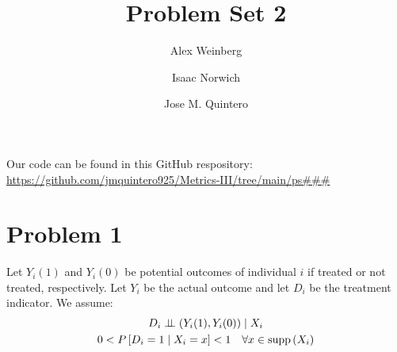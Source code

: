 \documentclass{article}
\title{Problem Set 2}
\author{Alex Weinberg \and Isaac Norwich \and Jose M. Quintero}
\begin{document}
\maketitle

Our code can be found in this GitHub respository: \url{https://github.com/jmquintero925/Metrics-III/tree/main/ps###}


\section*{Problem 1}
Let $Y_{i}(1)$ and $Y_{i}(0)$ be potential outcomes of individual $i$ if treated or not treated, respectively. Let $Y_{i}$ be the actual outcome and let $D_{i}$ be the treatment indicator. We assume:
\begin{align*}
\begin{gathered}
D_{i} \perp\!\!\!\perp \left(Y_{i}(1), Y_{i}(0)\right) \mid X_{i} \\
0<P\left[D_{i}=1 \mid X_{i}=x\right]<1 \quad \forall x \in \operatorname{supp}\left(X_{i}\right)
\end{gathered}
\end{align*}
\end{document}
